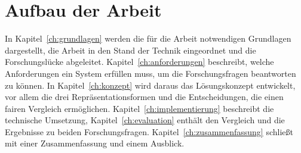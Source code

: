 \section{Aufbau der Arbeit}
\label{sec:ein-aufbau}

In Kapitel~\ref{ch:grundlagen} werden die für die Arbeit notwendigen Grundlagen dargestellt, die Arbeit in den Stand der Technik eingeordnet und die Forschungslücke abgeleitet.
Kapitel~\ref{ch:anforderungen} beschreibt, welche Anforderungen ein System erfüllen muss, um die Forschungsfragen beantworten zu können.
In Kapitel~\ref{ch:konzept} wird daraus das Lösungskonzept entwickelt, vor allem die drei Repräsentationsformen und die Entscheidungen, die einen fairen Vergleich ermöglichen.
Kapitel~\ref{ch:implementierung} beschreibt die technische Umsetzung, Kapitel~\ref{ch:evaluation} enthält den Vergleich und die Ergebnisse zu beiden Forschungsfragen.
Kapitel~\ref{ch:zusammenfassung} schließt mit einer Zusammenfassung und einem Ausblick.
